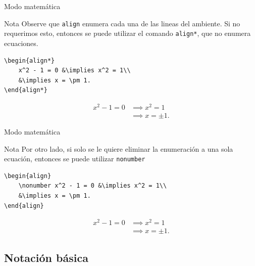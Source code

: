 \documentclass[../slides.tex]{subfiles}
\begin{document}
    \begin{frame}[fragile]{Modo matemática}
        \begin{block}{Nota}
        	Observe que \texttt{align} enumera cada una de las lineas del ambiente. Si no requerimos esto, entonces se puede utilizar el comando \texttt{align*}, que no enumera ecuaciones.
        \end{block}
            \begin{verbatim}
\begin{align*}
    x^2 - 1 = 0 &\implies x^2 = 1\\
    &\implies x = \pm 1.
\end{align*}
            \end{verbatim}
    \begin{align*}
        x^2 - 1 = 0 &\implies x^2 = 1\\
        &\implies x = \pm 1.
    \end{align*}
    \end{frame}
    
    \begin{frame}[fragile]{Modo matemática}
        \begin{block}{Nota}
        	Por otro lado, si solo se le quiere eliminar la enumeración a una sola ecuación, entonces se puede utilizar \texttt{nonumber}
        \end{block}
                \begin{verbatim}
\begin{align}
    \nonumber x^2 - 1 = 0 &\implies x^2 = 1\\
    &\implies x = \pm 1.
\end{align}
            \end{verbatim}
    \begin{align}
        \nonumber  x^2 - 1 = 0 &\implies x^2 = 1\\
        &\implies x = \pm 1.
    \end{align}
    \end{frame}
    
    \subsection{Notación básica}
    
\end{document}
